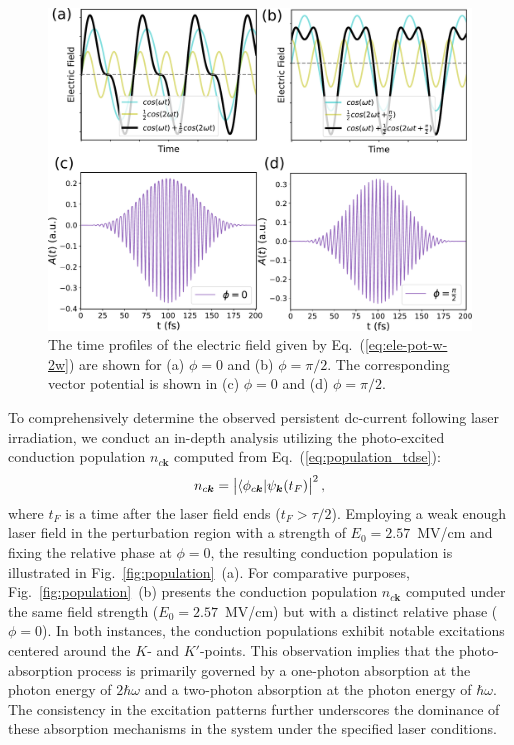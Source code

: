 \begin{figure}[htbp]
 \includegraphics[width=1.0\linewidth]{pic/electric.pdf}
\caption{\label{fig:electricfield} 
The time profiles of the electric field given by Eq.~(\ref{eq:ele-pot-w-2w}) are shown for (a) $\phi=0$ and (b) $\phi=\pi/2$. The corresponding vector potential is shown in (c) $\phi=0$ and (d) $\phi=\pi/2$.}
\end{figure}


To comprehensively determine the observed persistent dc-current following laser irradiation, we conduct an in-depth analysis utilizing the photo-excited conduction population $n_{c\mathbf{k}}$ computed from Eq.~(\ref{eq:population_tdse}): 
\begin{align}
n_{c\boldsymbol{k}} = \left | \langle \phi_{c \boldsymbol{k}} | \psi_{\boldsymbol{k}}(t_F) \right |^2,
\end{align}
where $t_F$ is a time after the laser field ends ($t_F>\tau/2$).
Employing a weak enough laser field in the perturbation region with a strength of $E_0=2.57$~MV/cm and fixing the relative phase at $\phi=0$, the resulting conduction population is illustrated in Fig.~\ref{fig:population}~(a). For comparative purposes, Fig.~\ref{fig:population}~(b) presents the conduction population $n_{c\mathbf{k}}$ computed under the same field strength ($E_0=2.57$~MV/cm) but with a distinct relative phase ($\phi=0$). In both instances, the conduction populations exhibit notable excitations centered around the $K$- and $K'$-points. This observation implies that the photo-absorption process is primarily governed by a one-photon absorption at the photon energy of $2\hbar \omega$ and a two-photon absorption at the photon energy of $\hbar \omega$. The consistency in the excitation patterns further underscores the dominance of these absorption mechanisms in the system under the specified laser conditions.


